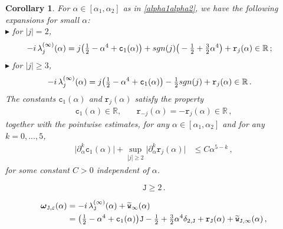 \documentclass[10pt,a4paper]{amsart}
\newtheorem{cor}{Corollary}
\newcommand{\N}{{\mathbb N}}
\newcommand{\R}{{\mathbb R}}
\newcommand{\bomega}{{\boldsymbol{\omega}}}
\newcommand{\im}{{\rm i}}
\newcommand{\pa}{\partial}
\newcommand{\tJ}{{\mathtt J}}
\newcommand{\tc}{{\mathtt c}}
\newcommand{\tr}{{\mathtt r}}
\newcommand{\tw}{{\mathtt w}}
\newcommand{\wt}[1]{{\widetilde{#1}}}
\begin{document}
\begin{cor}\label{cor.eigen.asympt}
For $\alpha \in [\alpha_{1},\alpha_{2}]$ as in \eqref{alpha1alpha2},	we have the following expansions for small $\alpha$:
\\[1mm]
\noindent $\blacktriangleright$ for $|j|= 2$,
\begin{equation}
	\begin{aligned}
		-\im\,\lambda_{j}^{(\infty)}(\alpha) &= j \big(\tfrac12 - \alpha^4 +\tc_{1}(\alpha) \big) + {\rm sgn}(j) \big(-\tfrac12 + \tfrac{3}{2} \alpha^4\big) + \tr_{j}(\alpha) \in\R\,;
	\end{aligned}
\end{equation}
\noindent $\blacktriangleright$ for $|j|\geq 3$, 
\begin{equation}
	\begin{aligned}
		-\im\,\lambda_{j}^{(\infty)}(\alpha) &= j \big(\tfrac12 -  \alpha^4 +\tc_{1}(\alpha) \big) - \tfrac12 {\rm sgn}(j) + \tr_{j}(\alpha)  \in \R \,. 
	\end{aligned}
\end{equation}
The constants $\tc_{1}(\alpha)$ and $\tr_{j}(\alpha)$   satisfy  the property
\begin{equation}\label{pure.im.cond}
	\begin{aligned}
		\tc_{1}(\alpha)\in\mathbb{R},& \quad \tr_{-j}(\alpha) = -{\tr}_{j}(\alpha)\in\mathbb{R}\,,
	\end{aligned}
\end{equation}
together with the pointwise estimates, for any $\alpha \in [\alpha_{1},\alpha_{2}]$ and  for any $k=0,...,5$,
\begin{align}\label{small.const.alpha}
	\big| \pa_{\alpha}^k \tc_{1}(\alpha) \big|+\sup_{|j|\geq 2}\big| \pa_{\alpha}^k \tr_{j}(\alpha)\big| & \leq C \alpha^{5-k} \,, 
	\end{align}
for some constant $C>0$ independent of $\alpha$.
\end{cor}

\begin{equation}\label{tangential.mode}
	\tJ \geq 2 \,.
\end{equation}

		\begin{align}
			\bomega_{\tJ,\varepsilon}(\alpha) & = -\im\,\lambda_{\tJ}^{(\infty)}(\alpha) + \wt\tw_{\infty}(\alpha) \\
			&=   \big(\tfrac{1}{2} -\alpha^4 +  \tc_{1}(\alpha) \big)\tJ - \tfrac12 +\tfrac32 \alpha^4 \delta_{2,\tJ}   + \tr_{\tJ}(\alpha) + \wt\tw_{\tJ,\infty}(\alpha)\,,\label{ME.1} 
		\end{align}
\end{document}
